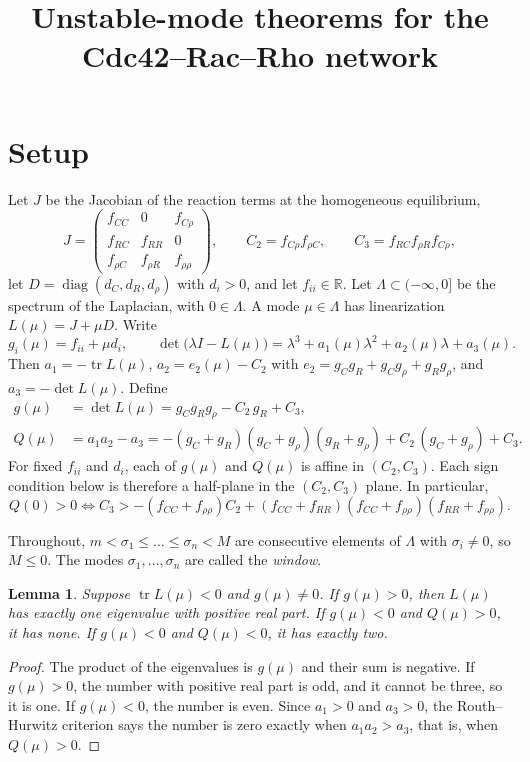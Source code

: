 \documentclass[11pt]{article}
\title{Unstable-mode theorems for the Cdc42--Rac--Rho network}
\author{}
\date{}
\newtheorem{lemma}{Lemma}
\theoremstyle{remark}
\begin{document}
\maketitle

\section{Setup}

Let $J$ be the Jacobian of the reaction terms at the homogeneous equilibrium,
\[
J=\begin{pmatrix} f_{CC} & 0 & f_{C\rho}\\ f_{RC} & f_{RR} & 0\\ f_{\rho C} & f_{\rho R} & f_{\rho\rho}\end{pmatrix},
\qquad
C_2=f_{C\rho}f_{\rho C},\qquad C_3=f_{RC}f_{\rho R}f_{C\rho},
\]
let $D=\operatorname{diag}(d_C,d_R,d_\rho)$ with $d_i>0$, and let $f_{ii}\in\mathbb{R}$. Let $\Lambda\subset(-\infty,0]$ be the spectrum of the Laplacian, with $0\in\Lambda$. A mode $\mu\in\Lambda$ has linearization $L(\mu)=J+\mu D$. Write
\[
g_i(\mu)=f_{ii}+\mu d_i,
\qquad
\det\bigl(\lambda I-L(\mu)\bigr)=\lambda^3+a_1(\mu)\lambda^2+a_2(\mu)\lambda+a_3(\mu).
\]
Then $a_1=-\operatorname{tr}L(\mu)$, $a_2=e_2(\mu)-C_2$ with $e_2=g_Cg_R+g_Cg_\rho+g_Rg_\rho$, and $a_3=-\det L(\mu)$. Define
\begin{align}
g(\mu)&=\det L(\mu)=g_Cg_Rg_\rho-C_2\,g_R+C_3, \label{eq:g}\\
Q(\mu)&=a_1a_2-a_3=-(g_C+g_R)(g_C+g_\rho)(g_R+g_\rho)+C_2\,(g_C+g_\rho)+C_3. \label{eq:Q}
\end{align}
For fixed $f_{ii}$ and $d_i$, each of $g(\mu)$ and $Q(\mu)$ is affine in $(C_2,C_3)$. Each sign condition below is therefore a half-plane in the $(C_2,C_3)$ plane. In particular,
\[
Q(0)>0\iff C_3>-(f_{CC}+f_{\rho\rho})C_2+(f_{CC}+f_{RR})(f_{CC}+f_{\rho\rho})(f_{RR}+f_{\rho\rho}).
\]

Throughout, $m<\sigma_1\le\dots\le\sigma_n<M$ are consecutive elements of $\Lambda$ with $\sigma_i\neq0$, so $M\le0$. The modes $\sigma_1,\dots,\sigma_n$ are called the \emph{window}.

\begin{lemma}\label{lem:count}
Suppose $\operatorname{tr}L(\mu)<0$ and $g(\mu)\neq0$. If $g(\mu)>0$, then $L(\mu)$ has exactly one eigenvalue with positive real part. If $g(\mu)<0$ and $Q(\mu)>0$, it has none. If $g(\mu)<0$ and $Q(\mu)<0$, it has exactly two.
\end{lemma}

\begin{proof}
The product of the eigenvalues is $g(\mu)$ and their sum is negative. If $g(\mu)>0$, the number with positive real part is odd, and it cannot be three, so it is one. If $g(\mu)<0$, the number is even. Since $a_1>0$ and $a_3>0$, the Routh--Hurwitz criterion says the number is zero exactly when $a_1a_2>a_3$, that is, when $Q(\mu)>0$.
\end{proof}
\end{document}
